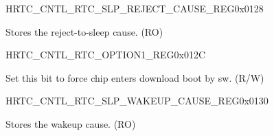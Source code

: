 \begin{register}{H}{RTC\_CNTL\_RTC\_SLP\_REJECT\_CAUSE\_REG}{0x{}0128}\label{regdesc:RTCCNTLRTCSLPREJECTCAUSEREG}
%
%
\regnewline%
\begin{regdesc}\begin{reglist}
\label{fielddesc:RTCCNTLREJECTCAUSE}\item [RTC\_CNTL\_REJECT\_CAUSE] Stores the reject-to-sleep cause. (RO)
\end{reglist}\end{regdesc}
\end{register}


\begin{register}{H}{RTC\_CNTL\_RTC\_OPTION1\_REG}{0x{}012C}\label{regdesc:RTCCNTLRTCOPTION1REG}
%
%
\regnewline%
\begin{regdesc}\begin{reglist}
\label{fielddesc:RTCCNTLFORCEDOWNLOADBOOT}\item [RTC\_CNTL\_FORCE\_DOWNLOAD\_BOOT] Set this bit to force chip enters download boot by sw. (R/W)
\end{reglist}\end{regdesc}
\end{register}


\begin{register}{H}{RTC\_CNTL\_RTC\_SLP\_WAKEUP\_CAUSE\_REG}{0x{}0130}\label{regdesc:RTCCNTLRTCSLPWAKEUPCAUSEREG}
%
%
\regnewline%
\begin{regdesc}\begin{reglist}
\label{fielddesc:RTCCNTLWAKEUPCAUSE}\item [RTC\_CNTL\_WAKEUP\_CAUSE] Stores the wakeup cause. (RO)
\end{reglist}\end{regdesc}
\end{register}



